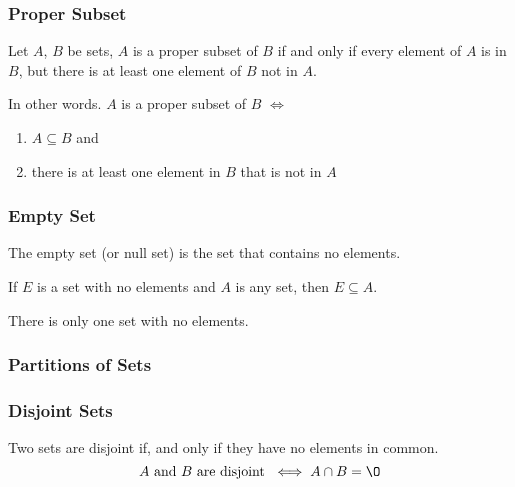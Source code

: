\documentclass[11pt]{article}
\begin{document}
\subsubsection{Proper Subset}

\begin{definition}\label{def:proper-subset}
    Let $A$, $B$ be sets, $A$ is a proper subset of $B$ if and only if every element of $A$ is in $B$, but there
    is at least one element of $B$ not in $A$.

    In other words. $A$ is a proper subset of $B$ $\iff$
    \begin{enumerate}
        \item $A \subseteq B$ and
        \item there is at least one element in $B$ that is not in $A$
    \end{enumerate}
\end{definition}

\subsubsection{Empty Set}

\begin{definition}\label{def:empty-set}
    The empty set (or null set) is the set that contains no elements.
\end{definition}

\begin{theorem}\label{thm:empty-set}\bl
    If $E$ is a set with no elements and $A$ is any set, then $E \subseteq A$.
\end{theorem}

\begin{corollary}\label{cor:empty-set-unique}\bl
    There is only one set with no elements.
\end{corollary}

\subsubsection{Partitions of Sets}

\subsubsection{Disjoint Sets}
\begin{definition}[Disjoint]\label{def:disjoint}
    Two sets are disjoint if, and only if they have no elements in common.
    \begin{equation*}
        \text{$A$ and $B$ are disjoint } \iff A \cap B = \O
    \end{equation*}
\end{definition}
\end{document}
